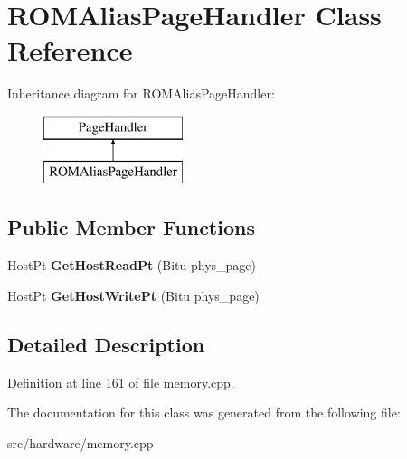\hypertarget{classROMAliasPageHandler}{\section{R\-O\-M\-Alias\-Page\-Handler Class Reference}
\label{classROMAliasPageHandler}
}
Inheritance diagram for R\-O\-M\-Alias\-Page\-Handler\-:\begin{figure}[H]
\begin{center}
\leavevmode
\includegraphics[height=2.000000cm]{classROMAliasPageHandler}
\end{center}
\end{figure}
\subsection*{Public Member Functions}
\begin{DoxyCompactItemize}
\item 
\hypertarget{classROMAliasPageHandler_ac9bc56f51008279f62a74204500ec4b3}{Host\-Pt {\bfseries Get\-Host\-Read\-Pt} (Bitu phys\-\_\-page)}\label{classROMAliasPageHandler_ac9bc56f51008279f62a74204500ec4b3}

\item 
\hypertarget{classROMAliasPageHandler_a305a02dd4698bb465b46e96268f2b375}{Host\-Pt {\bfseries Get\-Host\-Write\-Pt} (Bitu phys\-\_\-page)}\label{classROMAliasPageHandler_a305a02dd4698bb465b46e96268f2b375}

\end{DoxyCompactItemize}


\subsection{Detailed Description}


Definition at line 161 of file memory.\-cpp.



The documentation for this class was generated from the following file\-:\begin{DoxyCompactItemize}
\item 
src/hardware/memory.\-cpp\end{DoxyCompactItemize}
